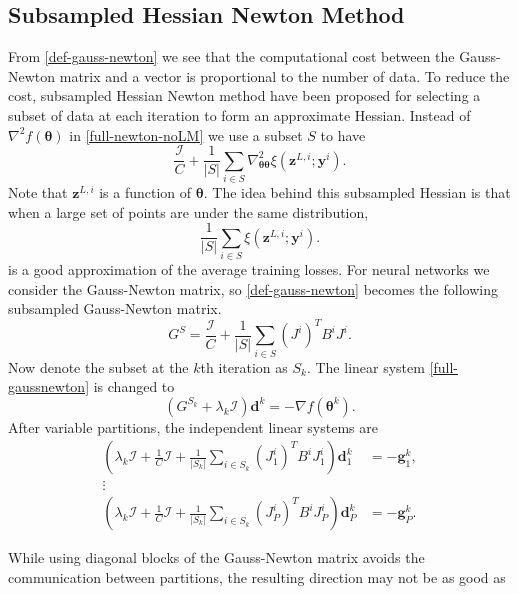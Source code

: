 \documentclass[12pt]{article}
\def\by{{\boldsymbol y}}
\def\bd{{\boldsymbol d}}
\def\bz{{\boldsymbol z}}
\def\bg{{\boldsymbol g}}
\def\btheta{\boldsymbol \theta}
\begin{document}
\subsection{Subsampled Hessian Newton Method}
\label{subsec:Subsampled}
From \eqref{def-gauss-newton} we see that the computational cost 
between the Gauss-Newton matrix and a vector is 
proportional to the number of data. To reduce the cost, 
subsampled Hessian Newton method \citep{RHB11a,JM10a,CCW15a} 
have been proposed for selecting a subset of data at each iteration to form an approximate Hessian. Instead of $\nabla^2 f(\btheta)$ in \eqref{full-newton-noLM} we use a subset $S$ to have
\begin{equation*}
	\frac{\mathcal I}{C} + \frac{1}{|S|}\sum_{i \in S} \nabla^2_{\btheta\btheta} \xi(\bz^{L,i};\by^i).
\end{equation*}
Note that $\bz^{L,i}$ is a function of $\btheta$. The idea behind this subsampled Hessian is that when a large set of points are under the same distribution,
\begin{equation*}
	\frac{1}{|S|}\sum_{i\in S} \xi(\bz^{L,i};\by^i).
\end{equation*}
is a good approximation of the average training losses. For neural networks we consider the Gauss-Newton matrix, so \eqref{def-gauss-newton} becomes the following subsampled Gauss-Newton matrix.
\begin{equation}
\label{sampled-Gauss}
	G^S = \frac{\mathcal I}{C} + \frac{1}{|S|} \sum_{i \in S} (J^i)^T B^i J^i.
\end{equation}
Now denote the subset at the $k$th iteration as $S_k$. The linear system \eqref{full-gaussnewton} is changed to
\begin{equation}
\label{sample-gaussnewton}
(G^{S_k}  + \lambda_k \mathcal I) \bd^k = - \nabla f(\btheta^k).
\end{equation}
After variable partitions, the independent linear systems are
\begin{align}
  \left( \lambda_k\mathcal I + \frac{1}{C} \mathcal I + \frac{1}{|S_k|} \sum_{i \in S_k} (J^i_1)^T B^i J^i_1 \right) \bd^k_1 &= -\bg_1^k, \nonumber\\
	\vdots  \label{block-gaussnewton}\\
  \left( \lambda_k\mathcal I + \frac{1}{C} \mathcal I + \frac{1}{|S_k|} \sum_{i \in S_k} (J^i_P)^T B^i J^i_P \right) \bd^k_P &= -\bg_P^k. \nonumber
\end{align}
\par While using diagonal blocks of the Gauss-Newton matrix avoids the communication between partitions, the resulting direction may not be as good as
\end{document}

